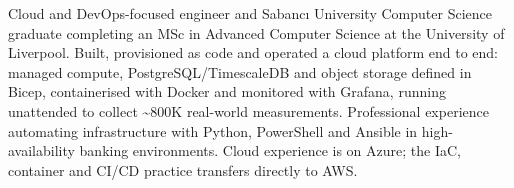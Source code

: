 



Cloud and DevOps-focused engineer and Sabancı University Computer Science graduate completing an MSc in Advanced Computer Science at the University of Liverpool. Built, provisioned as code and operated a cloud platform end to end: managed compute, PostgreSQL/TimescaleDB and object storage defined in Bicep, containerised with Docker and monitored with Grafana, running unattended to collect \textasciitilde 800K real-world measurements. Professional experience automating infrastructure with Python, PowerShell and Ansible in high-availability banking environments. Cloud experience is on Azure; the IaC, container and CI/CD practice transfers directly to AWS.




